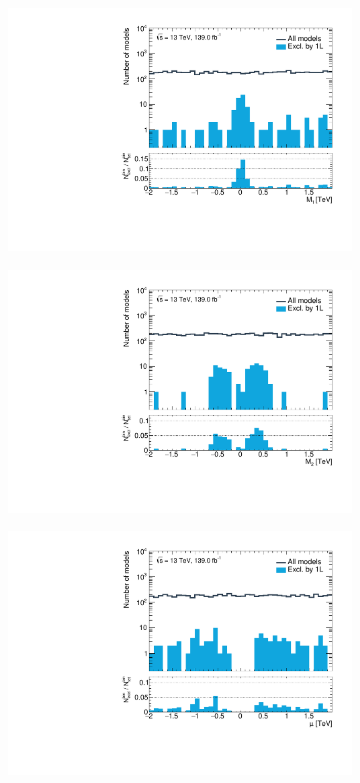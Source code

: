 \begin{figure}
	\centering
	\begin{subfigure}[b]{0.5\linewidth}
		\centering\includegraphics[width=\textwidth]{1D/M1}
	\end{subfigure}\hfill
	\begin{subfigure}[b]{0.5\linewidth}
		\centering\includegraphics[width=\textwidth]{1D/M2}
	\end{subfigure}\hfill
	\begin{subfigure}[b]{0.5\linewidth}
		\centering\includegraphics[width=\textwidth]{1D/mu}

\end{subfigure}
\end{figure}
